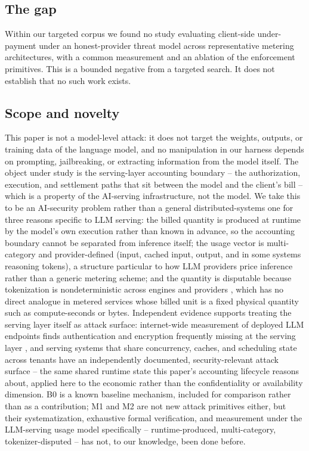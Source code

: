 \documentclass[manuscript,review,anonymous]{acmart}
\begin{document}
\subsection{The gap}
Within our targeted corpus we found no study evaluating client-side under-payment under
an honest-provider threat model across representative metering architectures, with a
common measurement and an ablation of the enforcement primitives. This is a bounded
negative from a targeted search. It does not establish that no such work exists.

\subsection{Scope and novelty}
This paper is not a model-level attack: it does not target the weights, outputs, or
training data of the language model, and no manipulation in our harness depends on
prompting, jailbreaking, or extracting information from the model itself. The object
under study is the serving-layer accounting boundary -- the authorization, execution,
and settlement paths that sit between the model and the client's bill -- which is a
property of the AI-serving infrastructure, not the model. We take this to be an
AI-security problem rather than a general distributed-systems one for three reasons
specific to LLM serving: the billed quantity is produced at runtime by the model's own
execution rather than known in advance, so the accounting boundary cannot be separated
from inference itself; the usage vector is multi-category and provider-defined (input,
cached input, output, and in some systems reasoning tokens), a structure particular to
how LLM providers price inference rather than a generic metering scheme; and the
quantity is disputable because tokenization is nondeterministic across engines and
providers \citep{petrov}, which has no direct analogue in metered services whose billed
unit is a fixed physical quantity such as compute-seconds or bytes. Independent evidence
supports treating the serving layer itself as attack surface: internet-wide measurement
of deployed LLM endpoints finds authentication and encryption frequently missing at the
serving layer \citep{unveilinglandscape}, and serving systems that share concurrency,
caches, and scheduling state across tenants have an independently documented,
security-relevant attack surface \citep{grief,gift} -- the same shared runtime state this
paper's accounting lifecycle reasons about, applied here to the economic rather than the
confidentiality or availability dimension. B0 is a known baseline mechanism, included for
comparison rather than as a contribution; M1 and M2 are not new attack primitives either,
but their systematization, exhaustive formal verification, and measurement under the
LLM-serving usage model specifically -- runtime-produced, multi-category,
tokenizer-disputed -- has not, to our knowledge, been done before.
\end{document}
